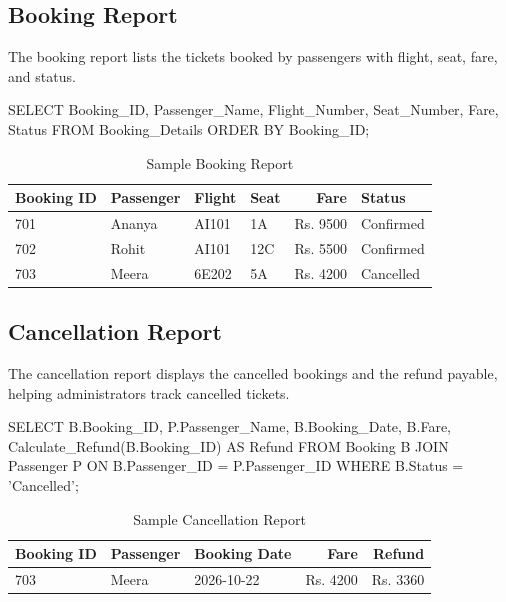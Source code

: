 \documentclass[12pt,a4paper]{article}
\begin{document}
\subsection{Booking Report}
The booking report lists the tickets booked by passengers with flight, seat, fare, and status.
\begin{code}
SELECT Booking_ID, Passenger_Name, Flight_Number, Seat_Number, Fare, Status
FROM Booking_Details ORDER BY Booking_ID;
\end{code}
\begin{table}[H]
\centering\small
\begin{tabular}{l l l l r l}
\toprule
\textbf{Booking ID} & \textbf{Passenger} & \textbf{Flight} & \textbf{Seat} & \textbf{Fare} & \textbf{Status}\\
\midrule
701 & Ananya & AI101 & 1A  & Rs. 9500 & Confirmed\\
702 & Rohit  & AI101 & 12C & Rs. 5500 & Confirmed\\
703 & Meera  & 6E202 & 5A  & Rs. 4200 & Cancelled\\
\bottomrule
\end{tabular}
\caption{Sample Booking Report}
\end{table}

\subsection{Cancellation Report}
The cancellation report displays the cancelled bookings and the refund payable, helping administrators
track cancelled tickets.
\begin{code}
SELECT B.Booking_ID, P.Passenger_Name, B.Booking_Date, B.Fare,
       Calculate_Refund(B.Booking_ID) AS Refund
FROM Booking B JOIN Passenger P ON B.Passenger_ID = P.Passenger_ID
WHERE B.Status = 'Cancelled';
\end{code}
\begin{table}[H]
\centering\small
\begin{tabular}{l l l r r}
\toprule
\textbf{Booking ID} & \textbf{Passenger} & \textbf{Booking Date} & \textbf{Fare} & \textbf{Refund}\\
\midrule
703 & Meera & 2026-10-22 & Rs. 4200 & Rs. 3360\\
\bottomrule
\end{tabular}
\caption{Sample Cancellation Report}
\end{table}
\end{document}
